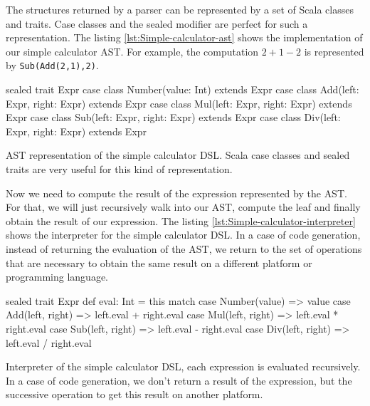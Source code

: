 The structures returned by a parser can be represented by a set of Scala classes
and traits. Case classes and the sealed modifier are perfect for such a
representation. The listing \ref{lst:Simple-calculator-ast} shows the
implementation of our simple calculator \gls{AST}. For example, the computation
$2 + 1 - 2$ is represented by \verb|Sub(Add(2,1),2)|.

\begin{listing}[ht]
\centering
\begin{scalacode}
sealed trait Expr
case class Number(value: Int) extends Expr
case class Add(left: Expr, right: Expr) extends Expr
case class Mul(left: Expr, right: Expr) extends Expr
case class Sub(left: Expr, right: Expr) extends Expr
case class Div(left: Expr, right: Expr) extends Expr
\end{scalacode}
\caption[\gls{AST} representation of the simple calculator \gls{DSL}]{\gls{AST}
representation of the simple calculator \gls{DSL}. Scala case classes and sealed
traits are very useful for this kind of representation.}
\label{lst:Simple-calculator-ast}
\end{listing}

Now we need to compute the result of the expression represented by the
\gls{AST}. For that, we will just recursively walk into our AST, compute the
leaf and finally obtain the result of our expression. The listing
\ref{lst:Simple-calculator-interpreter} shows the interpreter for the simple
calculator \gls{DSL}. In a case of code generation, instead of returning the
evaluation of the \gls{AST}, we return to the set of operations that are necessary
to obtain the same result on a different platform or programming language.

\begin{listing}[ht]
\centering
\begin{scalacode}
sealed trait Expr {
  def eval: Int = this match {
    case Number(value) => value
    case Add(left, right) => left.eval + right.eval
    case Mul(left, right) => left.eval * right.eval
    case Sub(left, right) => left.eval - right.eval
    case Div(left, right) => left.eval / right.eval
  }
}
\end{scalacode}
\caption[Interpreter of the simple calculator \gls{DSL}]{Interpreter of the
simple calculator \gls{DSL}, each expression is evaluated recursively. In a case
of code generation, we don’t return a result of the expression, but the
successive operation to get this result on another platform.}
\label{lst:Simple-calculator-interpreter}
\end{listing}

